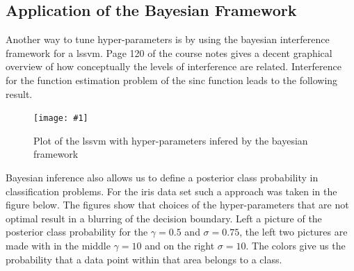 \documentclass[•]{article}
\newcommand{\apicture}[2] {
  \begin{figure}[H]
  \centering
  \texttt{[image: \#1]}
  \caption{#2}
  \end{figure}
}
\begin{document}
\subsection{Application of the Bayesian Framework}
Another way to tune hyper-parameters is by using the bayesian interference framework for a lssvm. Page 120 of the course notes gives a decent graphical overview of how conceptually the levels of interference are related. Interference for the function estimation problem of the sinc function leads to the following result.

\apicture{bayesianest.jpg}{Plot of the lssvm with hyper-parameters infered by the bayesian framework}

Bayesian inference also allows us to define a posterior class probability in classification problems. For the iris data set such a approach was taken in the figure below. The figures show that choices of the hyper-parameters that are not optimal result in a blurring of the decision boundary. Left a picture of the posterior class probability for the $\gamma = 0.5$ and $\sigma = 0.75$, the left two pictures are made with in the middle $\gamma = 10$ and on the right $\sigma = 10$.  The colors give us the probability that a data point within that area belongs to a class.
\end{document}
